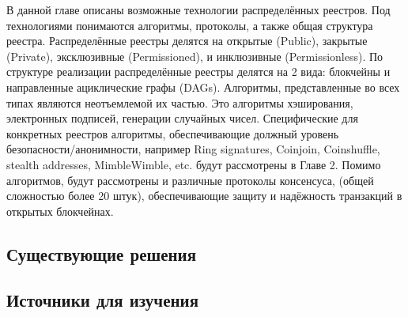 В данной главе описаны возможные технологии распределённых реестров. Под
технологиями понимаются алгоритмы, протоколы, а также общая структура реестра.
Распределённые реестры делятся на открытые (Public), закрытые (Private),
эксклюзивные (Permissioned), и инклюзивные (Permissionless).
По структуре реализации распределённые реестры делятся на 2 вида: блокчейны и
направленные ациклические графы (DAGs). Алгоритмы, представленные во всех типах
являются неотъемлемой их частью. Это алгоритмы хэширования, электронных
подписей, генерации случайных чисел. Специфические для конкретных реестров
алгоритмы, обеспечивающие должный уровень безопасности/анонимности, например
Ring signatures, Coinjoin, Coinshuffle, stealth addresses, MimbleWimble, etc.
будут рассмотрены в Главе 2. Помимо алгоритмов, будут рассмотрены и различные
протоколы консенсуса, (общей сложностью более 20 штук), обеспечивающие защиту и
надёжность транзакций в открытых блокчейнах.

\subsection{Существующие решения}


\newpage

\subsection{Источники для изучения}



